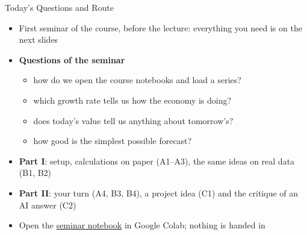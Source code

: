 \begin{frame}{Today's Questions and Route}
\itemsize{\small}
\begin{itemize}
    \item First seminar of the course, before the  lecture: everything you need is on the next slides
    \item \textbf{Questions of the seminar}
    \begin{itemize}
        \item how do we open the course notebooks and load a series?
        \item which growth rate tells us how the economy is doing?
        \item does today's value tell us anything about tomorrow's?
        \item how good is the simplest possible forecast?
    \end{itemize}
    \item \textbf{Part I}: setup, calculations on paper (A1--A3), the same ideas on real data (B1, B2)
    \item \textbf{Part II}: your turn (A4, B3, B4), a project idea (C1) and the critique of an AI answer (C2)
    \item Open the \href{\nb}{seminar notebook} in Google Colab; nothing is handed in
\end{itemize}
\end{frame}

